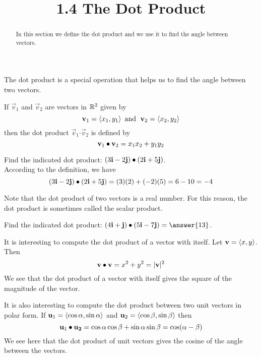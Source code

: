 \documentclass[handout]{ximera}
\title{1.4 The Dot Product}
\begin{document}
\begin{abstract}
In this section we define the dot product and we use it to find the angle between vectors.
\end{abstract}
 
\maketitle
The dot product is a special operation that helps us to find the angle between two vectors.
\begin{definition}
If $\vec{v}_1$ and $\vec{v}_2$ are vectors in $\mathbb R^2$ given by
\[
\mathbf{v}_1 = \left\langle x_1, y_1\right\rangle \text{  and   } \;\mathbf{v}_2 = \left\langle x_2, y_2\right\rangle
\]
then the dot product $\vec{v}_1 {\boldsymbol \cdot} \vec{v}_2$ is defined by
\[
\mathbf{v}_1 \bullet \mathbf{v}_2 = x_1x_2 + y_1y_2
\]
\end{definition}

\begin{example}
Find the indicated dot product: $\left(3\mathbf{i} -2\mathbf{j}\right) \bullet \left(2\mathbf{i} +5\mathbf{j}\right)$.\\
According to the definition, we have
\[
\left(3\mathbf{i} -2\mathbf{j}\right) \bullet \left(2\mathbf{i} +5\mathbf{j}\right) = (3)(2)+(-2)(5) = 6-10 = -4
\]
\end{example}

Note that the dot product of two vectors is a real number.  For this reason, the dot product is sometimes called the scalar product.

\begin{problem}
Find the indicated dot product: $\left(4\vec{i} + \vec{j}\right) \dotp \left(5\vec{i} -7\vec{j}\right) =\answer{13}$.\\
\end{problem}

It is interesting to compute the dot product of a vector with itself.  Let $\mathbf{v} = \left\langle x, y\right\rangle$. Then
\[
\mathbf{v} \bullet \mathbf{v} = x^2 + y^2 = |\mathbf{v}|^2
\]
We see that the dot product of a vector with itself gives the square of the magnitude of the vector.

It is also interesting to compute the dot product between two unit vectors in polar form.
If $\mathbf{u}_1 = \left\langle \cos \alpha, \sin \alpha\right\rangle$ and $\mathbf{u}_2 = \left\langle \cos \beta, \sin \beta\right\rangle$ then
\[
\mathbf{u}_1 \bullet \mathbf{u_2} = \cos \alpha \cos \beta + \sin \alpha \sin \beta = \cos(\alpha - \beta)
\]
We see here that the dot product of unit vectors gives the cosine of the angle between the vectors.
\end{document}
